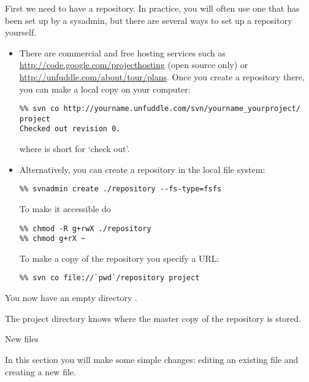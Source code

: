 First we need to have a repository. In practice, you will often use
one that has been set up by a sysadmin, but there are several ways to
set up a repository yourself.
\begin{itemize}
\item There are commercial and free hosting services such as
  \url{http://code.google.com/projecthosting} (open source only) or 
  \url{http://unfuddle.com/about/tour/plans}. Once you create a
  repository there, you can make a local copy on your computer:
\begin{verbatim}
%% svn co http://yourname.unfuddle.com/svn/yourname_yourproject/ project
Checked out revision 0.
\end{verbatim}
where  is short for `check out'.
\item Alternatively, you can create a repository in the local file system:
\begin{verbatim}
%% svnadmin create ./repository --fs-type=fsfs
\end{verbatim}
To make it accessible do
\begin{verbatim}
%% chmod -R g+rwX ./repository
%% chmod g+rX ~
\end{verbatim}
To make a copy of the repository you specify a  URL:
\begin{verbatim}
%% svn co file://`pwd`/repository project
\end{verbatim}
\end{itemize}
You now have an empty directory .


The project directory knows where the master copy of the repository is
stored.



 {New files}

\begin{purpose}
  In this section you will make some simple changes: editing an
  existing file and creating a new file.
\end{purpose}

